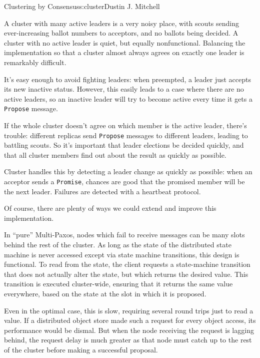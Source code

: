 \begin{aosachapter}{Clustering by Consensus}{s:cluster}{Dustin J. Mitchell}
\label{power-struggles}

A cluster with many active leaders is a very noisy place, with scouts
sending ever-increasing ballot numbers to acceptors, and no ballots
being decided. A cluster with no active leader is quiet, but equally
nonfunctional. Balancing the implementation so that a cluster almost
always agrees on exactly one leader is remarkably difficult.

It's easy enough to avoid fighting leaders: when preempted, a leader
just accepts its new inactive status. However, this easily leads to a
case where there are no active leaders, so an inactive leader will try
to become active every time it gets a \texttt{Propose} message.

If the whole cluster doesn't agree on which member is the active leader,
there's trouble: different replicas send \texttt{Propose} messages to
different leaders, leading to battling scouts. So it's important that
leader elections be decided quickly, and that all cluster members find
out about the result as quickly as possible.

Cluster handles this by detecting a leader change as quickly as
possible: when an acceptor sends a \texttt{Promise}, chances are good
that the promised member will be the next leader. Failures are detected
with a heartbeat protocol.

\label{further-extensions}

Of course, there are plenty of ways we could extend and improve this
implementation.

\label{catching-up}

In ``pure'' Multi-Paxos, nodes which fail to receive messages can be
many slots behind the rest of the cluster. As long as the state of the
distributed state machine is never accessed except via state machine
transitions, this design is functional. To read from the state, the
client requests a state-machine transition that does not actually alter
the state, but which returns the desired value. This transition is
executed cluster-wide, ensuring that it returns the same value
everywhere, based on the state at the slot in which it is proposed.

Even in the optimal case, this is slow, requiring several round trips
just to read a value. If a distributed object store made such a request
for every object access, its performance would be dismal. But when the
node receiving the request is lagging behind, the request delay is much
greater as that node must catch up to the rest of the cluster before
making a successful proposal.


\end{aosachapter}
